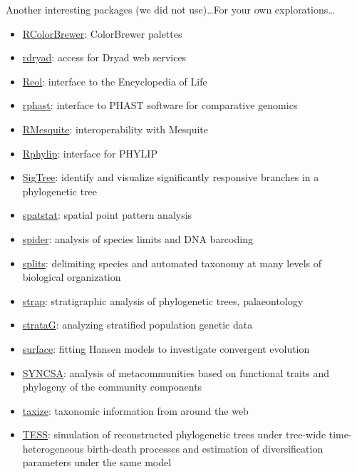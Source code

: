 \documentclass[compress, ucs, xelatex, 11pt, xcolor=svgnames,
  hyperref={
    bookmarks=true,
    unicode=true,
    colorlinks=true,
    pdftitle={Molecular data in R},
    plainpages=false,
    pdfauthor={Vojtech Zeisek},
    pdfsubject={Course about phylogeny and evolution in R},
    pdfcreator={XeLaTeX},
    pdfkeywords={R, evolution, phylogeny, molecular data},
    linkcolor=Tomato,
    anchorcolor=SaddleBrown,
    citecolor=Goldenrod,
    filecolor=DarkMagenta,
    menucolor=Sienna,
    urlcolor=DarkTurquoise,
    pdftex},
  url={hyphens, lowtilde} %
  ]{beamer}
\begin{document}
\begin{frame}[allowframebreaks]{Another interesting packages (we did not use)\ldots}{For your own explorations\ldots}
\begin{itemize}
    \item \href{https://cran.r-project.org/package=RColorBrewer}{RColorBrewer}: ColorBrewer palettes
    \item \href{https://cran.r-project.org/package=rdryad}{rdryad}: access for Dryad web services
    \item \href{https://cran.r-project.org/package=Reol}{Reol}: interface to the Encyclopedia of Life
    \item \href{https://cran.r-project.org/package=rphast}{rphast}: interface to PHAST software for comparative genomics
    \item \href{https://r-forge.r-project.org/projects/rmesquite/}{RMesquite}: interoperability with Mesquite
    \item \href{https://cran.r-project.org/package=Rphylip}{Rphylip}: interface for PHYLIP
    \item \href{https://cran.r-project.org/package=SigTree}{SigTree}: identify and visualize significantly responsive branches in a phylogenetic tree
    \item \href{https://cran.r-project.org/package=spatstat}{spatstat}: spatial point pattern analysis
    \item \href{https://cran.r-project.org/package=spider}{spider}: analysis of species limits and DNA barcoding
    \item \href{https://r-forge.r-project.org/projects/splits/}{splits}: delimiting species and automated taxonomy at many levels of biological organization
    \item \href{https://cran.r-project.org/package=strap}{strap}: stratigraphic analysis of phylogenetic trees, palaeontology
    \item \href{https://cran.r-project.org/package=strataG}{strataG}: analyzing stratified population genetic data
    \item \href{https://cran.r-project.org/package=surface}{surface}: fitting Hansen models to investigate convergent evolution
    \item \href{https://cran.r-project.org/package=SYNCSA}{SYNCSA}: analysis of metacommunities based on functional traits and phylogeny of the community components
    \item \href{https://cran.r-project.org/package=taxize}{taxize}: taxonomic information from around the web
    \item \href{https://cran.r-project.org/package=TESS}{TESS}: simulation of reconstructed phylogenetic trees under tree-wide time-heterogeneous birth-death processes and estimation of diversification parameters under the same model

\end{itemize}
\end{frame}
\end{document}
